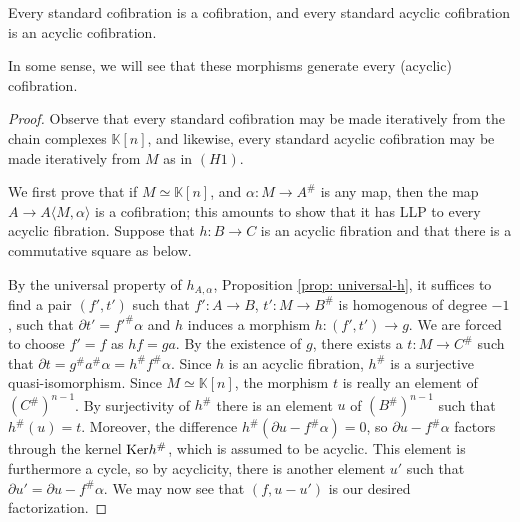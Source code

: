 \documentclass[../thesis.tex]{subfiles}
\begin{document}
            \begin{proposition}
                Every standard cofibration is a cofibration, and every standard acyclic cofibration is an acyclic cofibration.
            \end{proposition}

            \begin{remark}
                In some sense, we will see that these morphisms generate every (acyclic) cofibration.
            \end{remark}

            \begin{proof}
                Observe that every standard cofibration may be made iteratively from the chain complexes $\mathbb{K}[n]$, and likewise, every standard acyclic cofibration may be made iteratively from $M$ as in $(H1)$.

                We first prove that if $M \simeq \mathbb{K}[n]$, and $\alpha: M \rightarrow A^\#$ is any map, then the map $A \rightarrow A\langle M,\alpha\rangle$ is a cofibration; this amounts to show that it has LLP to every acyclic fibration. Suppose that $h: B \rightarrow C$ is an acyclic fibration and that there is a commutative square as below.
                \begin{center}
                \end{center}
                
                By the universal property of $h_{A,\alpha}$, Proposition \ref{prop: universal-h}, it suffices to find a pair $(f',t')$ such that $f': A \rightarrow B$, $t' : M \rightarrow B^\#$ is homogenous of degree $-1$, such that $\partial t' = f'^\#\alpha$ and $h$ induces a morphism $h : (f',t') \rightarrow g$. We are forced to choose $f' = f$ as $hf = ga$. By the existence of $g$, there exists a $t : M \rightarrow C^\#$ such that $\partial t = g^\#a^\#\alpha = h^\#f^\#\alpha$. Since $h$ is an acyclic fibration, $h^\#$ is a surjective quasi-isomorphism. Since $M \simeq \mathbb{K}[n]$, the morphism $t$ is really an element of $(C^{\#})^{n-1}$. By surjectivity of $h^\#$ there is an element $u$ of $(B^{\#})^{n-1}$ such that $h^\#(u) = t$. Moreover, the difference $h^\#(\partial u - f^\#\alpha) = 0$, so $\partial u - f^\#\alpha$ factors through the kernel $\tt{Ker} h^\#$, which is assumed to be acyclic. This element is furthermore a cycle, so by acyclicity, there is another element $u'$ such that $\partial u' = \partial u - f^\#\alpha$. We may now see that $(f, u - u')$ is our desired factorization.
                

\end{proof}
\end{document}
